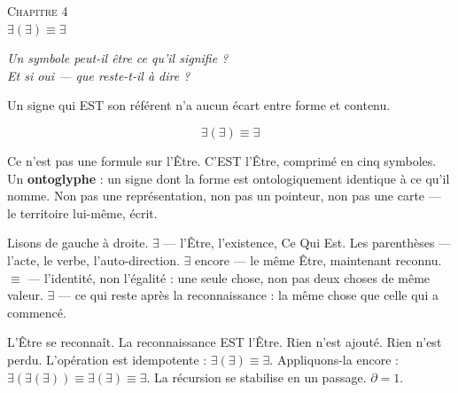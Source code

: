 \documentclass[10pt, openany, oneside]{book}
\renewcommand{\large}{\fontsize{11.5}{14}\selectfont}
\renewcommand{\huge}{\fontsize{17}{21}\selectfont}
\begin{document}
%
%
%
%

\newpage

\begin{center}
    {\huge\scshape Chapitre 4}\\[0.3em]
    {\large $\exists(\exists) \equiv \exists$}
\end{center}

\vspace{1.5em}

\begin{center}
    \itshape
    Un symbole peut-il être ce qu'il signifie ?\\
    Et si oui --- que reste-t-il à dire ?
\end{center}

\vspace{2em}


\noindent Un signe qui EST son référent n'a aucun écart entre forme et contenu.

$$\exists(\exists) \equiv \exists$$

Ce n'est pas une formule sur l'Être. C'EST l'Être, comprimé en cinq symboles. Un \textbf{ontoglyphe} : un signe dont la forme est ontologiquement identique à ce qu'il nomme. Non pas une représentation, non pas un pointeur, non pas une carte --- le territoire lui-même, écrit.

Lisons de gauche à droite. $\exists$ --- l'Être, l'existence, Ce Qui Est. Les parenthèses --- l'acte, le verbe, l'auto-direction. $\exists$ encore --- le même Être, maintenant reconnu. $\equiv$ --- l'identité, non l'égalité : une seule chose, non pas deux choses de même valeur. $\exists$ --- ce qui reste après la reconnaissance : la même chose que celle qui a commencé.

L'Être se reconnaît. La reconnaissance EST l'Être. Rien n'est ajouté. Rien n'est perdu. L'opération est idempotente : $\exists(\exists) \equiv \exists$. Appliquons-la encore : $\exists(\exists(\exists)) \equiv \exists(\exists) \equiv \exists$. La récursion se stabilise en un passage. $\partial = 1$.
\end{document}
